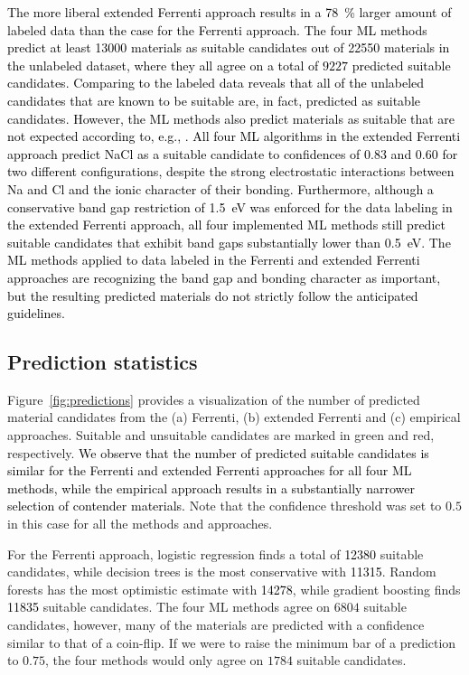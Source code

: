 \documentclass[superscriptaddress,unsortedaddress,
 amsmath,amssymb,
 aps,
]{revtex4-2}
\newcommand{\mrk}[1]{\textcolor{black}{#1}}
\begin{document}
\mrk{The more liberal extended Ferrenti approach results in a \SI{78}{\percent} larger 
amount of labeled data than the case for the Ferrenti approach.  
The four ML methods predict at least \mrk{\num{13000}} materials as suitable candidates out of \mrk{\num{22550}} materials in the unlabeled dataset, where they all agree on a total of $9227$ predicted suitable candidates. Comparing to the labeled data reveals that all of the unlabeled candidates that are known to be suitable are, in fact, predicted as suitable candidates. However, the ML methods also predict materials as suitable that are not expected according to, e.g., \citeauthor{Weber2010} \cite{Weber2010}. 
All four ML algorithms in the extended Ferrenti approach predict NaCl as a suitable candidate to confidences of $0.83$ and $0.60$ for two different configurations, despite the strong electrostatic interactions between Na and Cl and the ionic character of their bonding.  
Furthermore, although a conservative band gap restriction of \SI{1.5}{\electronvolt} was enforced for the data labeling in the extended Ferrenti approach, all four implemented ML methods still predict suitable candidates that exhibit band gaps substantially lower than \SI{0.5}{\electronvolt}.  
The ML methods applied to data labeled in the Ferrenti and extended Ferrenti approaches are recognizing the band gap and bonding character as important, but the resulting predicted materials do not strictly follow the anticipated guidelines. }

\subsection*{Prediction statistics}

Figure~\ref{fig:predictions} provides a visualization of the number of predicted material candidates from the (a) Ferrenti, (b) extended Ferrenti and (c) empirical approaches. Suitable and unsuitable candidates are marked in green and red, respectively. \mrk{We observe that the number of predicted suitable candidates is similar for the Ferrenti and extended Ferrenti approaches for all four ML methods, while the empirical approach results in a substantially narrower selection of contender materials.} 
Note that the confidence threshold was set to $0.5$ in this case for all the methods and approaches. 

For the Ferrenti approach, logistic regression finds a total of \mrk{\num{12380}} suitable candidates, while decision trees is the most conservative with \mrk{\num{11315}}. Random forests has the most optimistic estimate with \mrk{\num{14278}}, while gradient boosting finds \mrk{\num{11835}} suitable candidates. The four ML methods agree on $6804$ suitable candidates,  however, many of the materials are predicted with a confidence similar to that of a coin-flip.
If we were to raise the minimum bar of a prediction to $0.75$, the four methods would only agree on $1784$ suitable candidates. 
\end{document}
